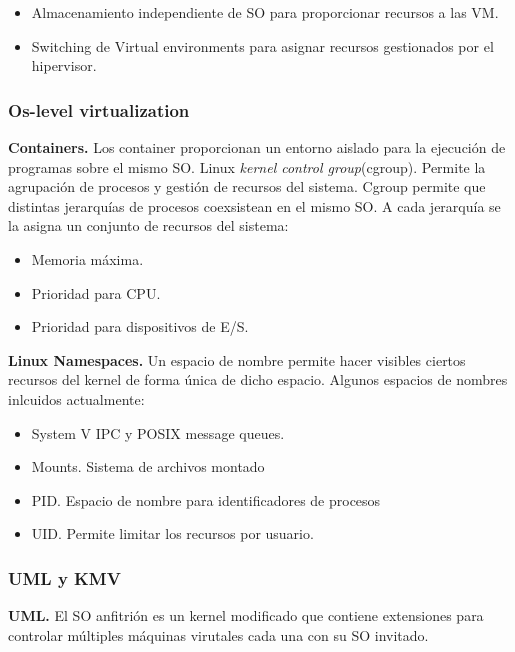 \documentclass{article}
\begin{document}
			 \begin{itemize}
			 \item Almacenamiento independiente de SO para proporcionar recursos a las VM.
			 \item Switching de Virtual environments para asignar recursos gestionados por el hipervisor.
			 \end{itemize}
			 
		\subsubsection{Os-level virtualization}
			\textbf{Containers.} Los container proporcionan un entorno aislado para la ejecución de programas sobre el mismo SO. Linux \textit{kernel control group}(cgroup). Permite la agrupación de procesos y gestión de recursos del sistema. Cgroup permite que distintas jerarquías de procesos coexsistean en el mismo SO. A cada jerarquía se la asigna un conjunto de recursos del sistema:
				
				\begin{itemize}
				\item Memoria máxima.
				\item Prioridad para CPU.
				\item Prioridad para dispositivos de E/S.
				\end{itemize}
				
			\textbf{Linux Namespaces.} Un espacio de nombre permite hacer visibles ciertos recursos del kernel de forma única de dicho espacio. Algunos espacios de nombres inlcuidos actualmente:
			
				\begin{itemize}
				\item System V IPC y POSIX message queues.
				\item Mounts. Sistema de archivos montado
				\item PID. Espacio de nombre para identificadores de procesos
				\item UID. Permite limitar los recursos por usuario.
				\end{itemize}
				
		\subsubsection{UML y KMV}
			\textbf{UML.} El SO anfitrión es un kernel modificado que contiene extensiones para controlar múltiples máquinas virutales cada una con su SO invitado. \\
			
\end{document}

